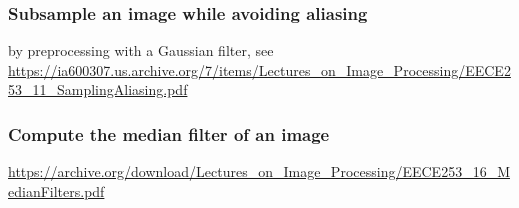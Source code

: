 \documentclass[10pt,a4paper]{article}
\begin{document}
  \subsubsection{Subsample an image while avoiding aliasing}
  by preprocessing with a Gaussian filter, see   \url{https://ia600307.us.archive.org/7/items/Lectures_on_Image_Processing/EECE253_11_SamplingAliasing.pdf}

  \subsubsection{Compute the median filter of an image}
  \url{https://archive.org/download/Lectures_on_Image_Processing/EECE253_16_MedianFilters.pdf}
\end{document}
